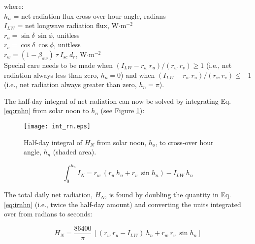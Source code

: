\noindent where:\\
\indent $h_n$ = net radiation flux cross-over hour angle, radians\\
\indent $I_{LW}$ = net longwave radiation flux, W$\cdot$m$^{-2}$\\
\indent $r_u = \sin\delta\: \sin\phi$, unitless \\
\indent $r_v = \cos\delta\: \cos\phi$, unitless \\
\indent $r_w = \left(1-\beta_{sw}\right)\:\tau\: I_{sc}\: d_r$, W$\cdot$m$^{-2}$\\

\noindent Special care needs to be made when $(I_{LW}-r_w\: r_u)/(r_w\: r_v) \geq 1$ (i.e., net radiation always less than zero, $h_n = 0$) and when $(I_{LW}-r_w\: r_u)/(r_w\: r_v) \leq -1$ (i.e., net radiation always greater than zero, $h_n = \pi$). 

The half-day integral of net radiation can now be solved by integrating Eq. \ref{eq:rnhn} from solar noon to $h_n$ (see Figure \ref{fig:intrn}):

\begin{figure}[ht!]
    \texttt{[image: int\_rn.eps]}
    \caption{Half-day integral of $H_N$ from solar noon, $h_o$, to cross-over hour angle, $h_n$ (shaded area).}
    \label{fig:intrn}
\end{figure}

\begin{equation}
\label{eq:irnhn}
	\int_0^{h_n} I_{N} = r_w\: \left(r_u\: h_n + r_v\: \sin h_n \right) - 
	I_{LW}\: h_n
\end{equation}

\noindent The total daily net radiation, $H_N$, is found by doubling the quantity in Eq. \ref{eq:irnhn} (i.e., twice the half-day amount) and converting the units integrated over from radians to seconds:

\begin{equation}
\label{eq:dayrn}
	H_N = \frac{86400}{\pi}\: \left[ 
	             \left( r_w\: r_u - I_{LW}\right)\: h_n + 
	             r_w\: r_v\: \sin h_n
	         \right]
\end{equation}


